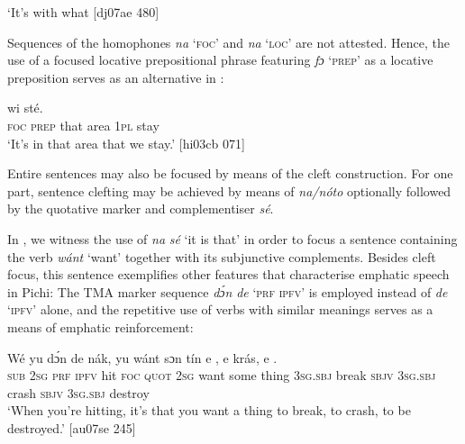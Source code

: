 \glt ‘It’s with what [dj07ae 480]
\z

Sequences of the homophones \textit{na} ‘\textsc{foc}’ and \textit{na} ‘\textsc{loc}’ are not attested. Hence, the use of a focused locative prepositional phrase featuring \textit{fɔ} ‘\textsc{prep}’ as a locative preposition serves as an alternative in :


\ea%
    \label{ex:key:709}
    \gll {}        wi  sté.\\
\textsc{foc}  \textsc{prep}  that  area    \textsc{1pl}  stay\\

\glt ‘It’s in that area that we stay.’ [hi03cb 071]
\z

Entire sentences may also be focused by means of the cleft construction. For one part, sentence clefting may be achieved by means of \textit{na}\textit{\textup{/}}\textit{nóto} optionally followed by the quotative marker and complementiser \textit{sé}.


In , we witness the use of \textit{na} \textit{sé} ‘it is that’ in order to focus a sentence containing the verb \textit{wánt} ‘want’ together with its subjunctive complements. Besides cleft focus, this sentence exemplifies other features that characterise emphatic speech in Pichi: The TMA marker sequence \textit{dɔ́n} \textit{de} ‘\textsc{prf} \textsc{ipfv’} is employed instead of \textit{de} \textsc{‘ipfv’} alone, and the repetitive use of verbs with similar meanings serves as a means of emphatic reinforcement: 



\ea%
    \label{ex:key:710}
    \gll Wé  yu  dɔ́n  de  nák,          yu  wánt  sɔn    tín    
e    ,      e    krás,      e    .\\
\textsc{sub}  \textsc{2sg}  \textsc{prf}  \textsc{ipfv}  hit    \textsc{foc}  \textsc{quot}    \textsc{2sg}  want  some  thing  
\textsc{3sg.sbj}  break   \textsc{sbjv}    \textsc{3sg.sbj}  crash  \textsc{sbjv}    \textsc{3sg.sbj}  destroy\\

\glt ‘When you’re hitting, it’s that you want a thing to break, to crash, to be 
destroyed.’ [au07se 245]
\z

